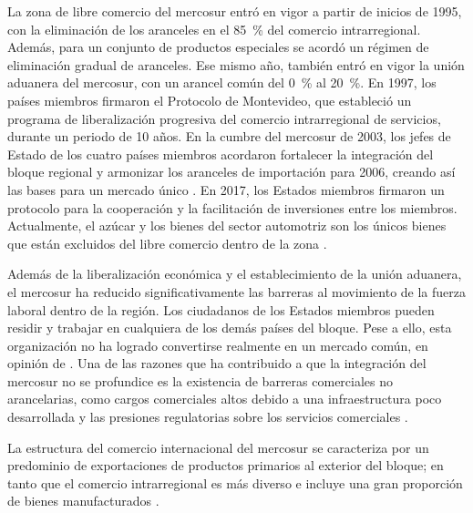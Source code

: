 La zona de libre comercio del \gls{mercosur} entró en vigor a partir de inicios de 1995, con la eliminación de los aranceles en el 85~\% del comercio intrarregional. Además, para un conjunto de productos especiales se acordó un régimen de eliminación gradual de aranceles. Ese mismo año, también entró en vigor la unión aduanera del \gls{mercosur}, con un arancel común del 0~\% al 20~\%. En 1997, los países miembros firmaron el Protocolo de Montevideo, que estableció un programa de liberalización progresiva del comercio intrarregional de servicios, durante un periodo de 10 años. En la cumbre del \gls{mercosur} de 2003, los jefes de Estado de los cuatro países miembros acordaron fortalecer la integración del bloque regional y armonizar los aranceles de importación para 2006, creando así las bases para un mercado único \parencite[p.~770]{EuropaDirectory2022}. En 2017, los Estados miembros firmaron un protocolo para la cooperación y la facilitación de inversiones entre los miembros. Actualmente, el azúcar y los bienes del sector automotriz son los únicos bienes que están excluidos del libre comercio dentro de la zona \parencite{MERCOSUR_logro10}.

 Además de la liberalización económica y el establecimiento de la unión aduanera, el \gls{mercosur} ha reducido significativamente las barreras al movimiento de la fuerza laboral dentro de la región. Los ciudadanos de los Estados miembros pueden residir y trabajar en cualquiera de los demás países del bloque. Pese a ello, esta organización no ha logrado convertirse realmente en un mercado común, en opinión de \textcite{Lakos2025}. Una de las razones que ha contribuido a que la integración del \gls{mercosur} no se profundice es la existencia de barreras comerciales no arancelarias, como cargos comerciales altos debido a una infraestructura poco desarrollada y las presiones regulatorias sobre los servicios comerciales \parencite[p.~201]{Lakos2025}.

La estructura del comercio internacional del \gls{mercosur} se caracteriza por un predominio de exportaciones de productos primarios al exterior del bloque; en tanto que el comercio intrarregional es más diverso e incluye una gran proporción de bienes manufacturados \parencite[p.~201]{Lakos2025}. 


